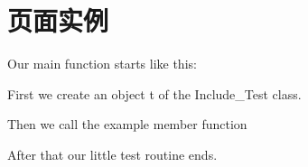 \chapter{页面实例}
\hypertarget{_xE9_xA1_xB5_xE9_x9D_xA2_xE5_xAE_x9E_xE4_xBE_x8B}{}\label{_xE9_xA1_xB5_xE9_x9D_xA2_xE5_xAE_x9E_xE4_xBE_x8B}
 Our main function starts like this\+: 
\begin{DoxyCodeInclude}{0}

\end{DoxyCodeInclude}
First we create an object {\ttfamily t} of the Include\+\_\+\+Test class. 
\begin{DoxyCodeInclude}{0}

\end{DoxyCodeInclude}
Then we call the example member function 
\begin{DoxyCodeInclude}{0}

\end{DoxyCodeInclude}
After that our little test routine ends. 
\begin{DoxyCodeInclude}{0}

\end{DoxyCodeInclude}
